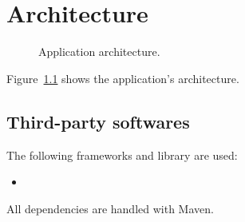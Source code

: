 \chapter{Architecture}

\begin{figure}[p]
	\caption{Application architecture.}
	\label{fig:arch}
\end{figure}

Figure~\ref{fig:arch} shows the application's architecture.

\section{Third-party softwares}

The following frameworks and library are used:
\begin{itemize}
	\item \textellipsis
\end{itemize}

All dependencies are handled with Maven.

